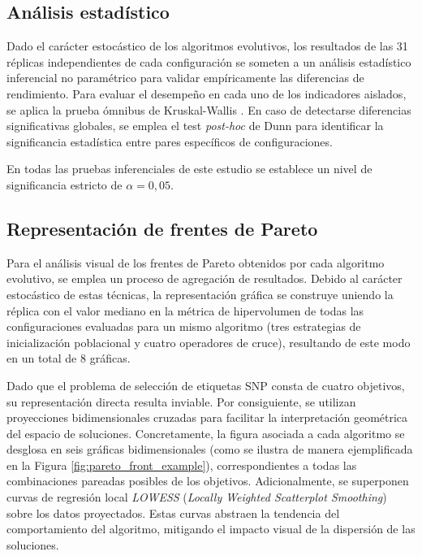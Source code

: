 \subsection{Análisis estadístico}

Dado el carácter estocástico de los algoritmos evolutivos, los resultados de las 31 réplicas independientes \cite{granado2020multiobjective} de cada configuración se someten a un análisis estadístico inferencial no paramétrico para validar empíricamente las diferencias de rendimiento. Para evaluar el desempeño en cada uno de los indicadores aislados, se aplica la prueba ómnibus de Kruskal-Wallis \cite{kruskal1952use}. En caso de detectarse diferencias significativas globales, se emplea el test \textit{post-hoc} de Dunn \cite{dunn1964multiple} para identificar la significancia estadística entre pares específicos de configuraciones.

En todas las pruebas inferenciales de este estudio se establece un nivel de significancia estricto de $\alpha = 0{,}05$.

\subsection{Representación de frentes de Pareto}

Para el análisis visual de los frentes de Pareto obtenidos por cada algoritmo evolutivo, se emplea un proceso de agregación de resultados. Debido al carácter estocástico de estas técnicas, la representación gráfica se construye uniendo la réplica con el valor mediano en la métrica de hipervolumen \cite{knowles2006tutorial} de todas las configuraciones evaluadas para un mismo algoritmo (tres estrategias de inicialización poblacional y cuatro operadores de cruce), resultando de este modo en un total de 8 gráficas.

Dado que el problema de selección de etiquetas SNP consta de cuatro objetivos, su representación directa resulta inviable. Por consiguiente, se utilizan proyecciones bidimensionales cruzadas para facilitar la interpretación geométrica del espacio de soluciones. Concretamente, la figura asociada a cada algoritmo se desglosa en seis gráficas bidimensionales (como se ilustra de manera ejemplificada en la Figura \ref{fig:pareto_front_example}), correspondientes a todas las combinaciones pareadas posibles de los objetivos. Adicionalmente, se superponen curvas de regresión local \textit{LOWESS} (\textit{Locally Weighted Scatterplot Smoothing}) \cite{cleveland1979robust} sobre los datos proyectados. Estas curvas abstraen la tendencia del comportamiento del algoritmo, mitigando el impacto visual de la dispersión de las soluciones.

